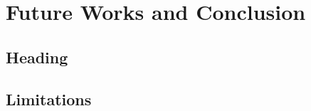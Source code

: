 \chapter{Future Works and Conclusion}\label{chap:conclusion}
\section{Heading}\label{sec:heading31}

\section{Limitations}\label{sec:limitations}